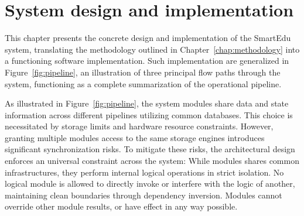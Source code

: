 \chapter{System design and implementation}\label{chap:system}
This chapter presents the concrete design and implementation of the SmartEdu system, translating the methodology outlined in Chapter~\ref{chap:methodology} into a 
functioning software implementation. Such implementation are generalized in Figure~\ref{fig:pipeline}, an illustration of three principal flow paths through the system, functioning as a complete summarization of the 
operational pipeline.



As illustrated in Figure~\ref{fig:pipeline}, the system modules share data and state information across different pipelines utilizing common databases. 
This choice is necessitated by storage limits and hardware resource constraints. However, granting multiple modules access to the same storage engines introduces 
significant synchronization risks. To mitigate these risks, the architectural design enforces an universal constraint across the system:
While modules shares common infrastructures, 
  they perform internal logical operations in strict isolation. No logical module is allowed to directly invoke or interfere with the logic of another, 
  maintaining clean boundaries through dependency inversion. Modules cannot override other module results, or have effect in any way possible.

